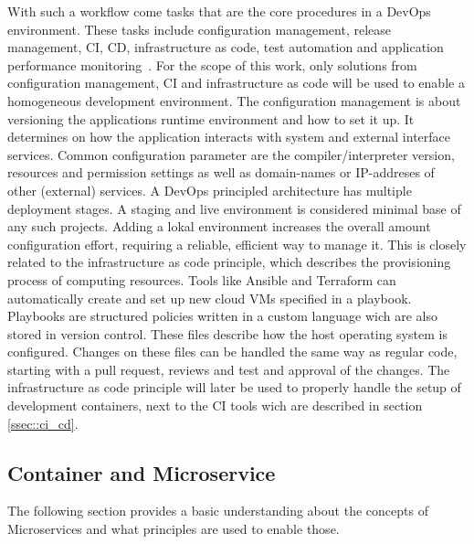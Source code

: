 \documentclass[12pt, a4paper]{article}
\begin{document}
        \noindent With such a workflow come tasks that are the core procedures in a DevOps environment. These tasks include configuration management, release management, \acl*{CI}, \acl{CD}, infrastructure as code, test automation and application performance monitoring~\cite{azuredevops}.\newline
        For the scope of this work, only solutions from configuration management, \acl*{CI} and infrastructure as code will be used to enable a homogeneous development environment. The configuration management is about versioning the applications runtime environment and how to set it up. It determines on how the application interacts with system and external interface services. Common configuration parameter are the compiler/interpreter version, resources and permission settings as well as domain-names or \acs{IP}-addreses of other (external) services. A DevOps principled architecture has multiple deployment stages. A staging and live environment is considered minimal base of any such projects. Adding a lokal environment increases the overall amount configuration effort, requiring a reliable, efficient way to manage it. This is closely related to the infrastructure as code principle, which describes the provisioning process of computing resources. Tools like Ansible and Terraform can automatically create and set up new cloud \ac{VM}s specified in a playbook. Playbooks are structured policies written in a custom language wich are also stored in version control.\newline
        These files describe how the host operating system is configured. Changes on these files can be handled the same way as regular code, starting with a pull request, reviews and test and approval of the changes. The infrastructure as code principle will later be used to properly handle the setup of development containers, next to the \acs{CI} tools wich are described in section \ref{ssec::ci_cd}.

    \subsection{Container and Microservice}\label{ssec::microservices}
    The following section provides a basic understanding about the concepts of Microservices and what principles are used to enable those.
\end{document}
